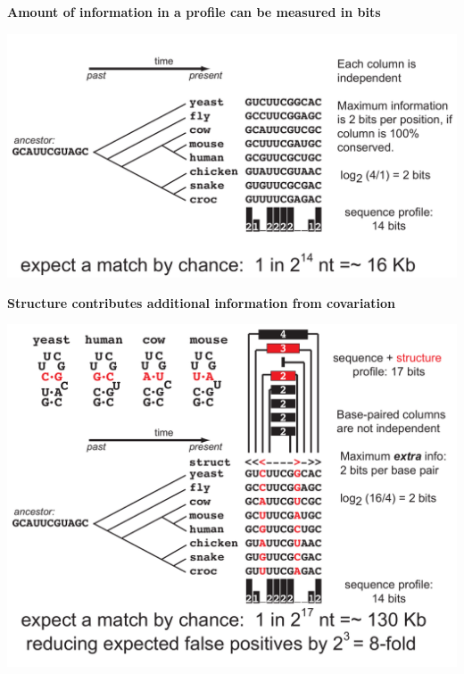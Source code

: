 \documentclass[landscape]{slides}
\begin{document}
\begin{slide}
\begin{center}
\textbf{Amount of information in a profile can be measured in bits}
\medskip

\includegraphics[width=9in]{figs/seqstructprofiles-2014-seqinfo}
\end{center}

\vfill
\end{slide}
\begin{slide}
\begin{center}
\textbf{Structure contributes additional information from covariation}
\medskip

\includegraphics[width=9in]{figs/seqstructprofiles-2014-structinfo}
\end{center}

\vfill
\end{slide}
\end{document}
